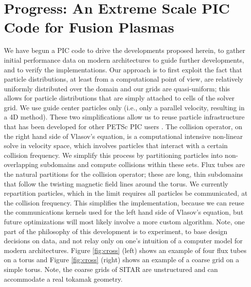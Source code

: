 \documentclass[review]{siamart}
\begin{document}
\section{Progress: An Extreme Scale PIC Code for Fusion Plasmas}

We have begun a PIC code to drive the developments proposed herein, to gather initial performance data on modern architectures to guide further developments, and to verify the implementations.
Our approach is to first exploit the fact that particle distributions, at least from a computational point of view, are relatively uniformly distributed over the domain and our grids are quasi-uniform; this allows for particle distributions that are simply attached to cells of the solver grid.
We use guide center particles only (i.e., only a parallel velocity, resulting in a 4D method).
These two simplifications allow us to reuse particle infrastructure that has been developed for other PETSc PIC users \cite{may2014ptatin}.
The collision operator, on the right hand side of Vlasov's equation, is a computational intensive non-linear solve in velocity space, which involves particles that interact with a certain collision frequency.
We simplify this process by partitioning particles into non-overlapping subdomains and compute collisions within these sets.
Flux tubes are the natural partitions for the collision operator; these are long, thin subdomains that follow the twisting magnetic field lines around the torus.
We currently repartition particles, which in the limit requires all particles be communicated, at the collision frequency.
This simplifies the implementation, because we can reuse the communications kernels used for the left hand side of Vlasov's equation, but future optimizations will most likely involve a more custom algorithm.
Note, one part of the philosophy of this development is to experiment, to base design decisions on data, and not relay only on one's intuition of a computer model for modern architectures.
Figure \ref{fig:cross} (left) shows an example of four flux tubes on a torus and Figure \ref{fig:cross} (right) shows an example of a coarse grid on a simple torus.
Note, the coarse grids of SITAR are unstructured and can accommodate a real tokamak geometry.
\end{document}
